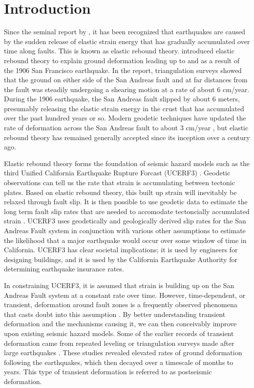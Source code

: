 \chapter{Introduction}


Since the seminal report by \citet{Reid1910}, it has been recognized
that earthquakes are caused by the sudden release of elastic strain
energy that has gradually accumulated over time along faults. This is
known as elastic rebound theory. \citet{Reid1910} introduced elastic
rebound theory to explain ground deformation leading up to and as a
result of the 1906 San Francisco earthquake. In the report,
triangulation surveys showed that the ground on either side of the San
Andreas fault and at far distances from the fault was steadily
undergoing a shearing motion at a rate of about 6 cm/year. During the
1906 earthquake, the San Andreas fault slipped by about 6 meters,
presumably releasing the elastic strain energy in the crust that has
accumulated over the past hundred years or so. Modern geodetic
techniques have updated the rate of deformation across the San Andreas
fault to about 3 cm/year \citep{Savage1973}, but elastic rebound
theory has remained generally accepted since its inception over a
century ago.

Elastic rebound theory forms the foundation of seismic hazard models
such as the third Unified California Earthquake Rupture Forcast
(UCERF3) \citep{Field2014}. Geodetic observations can tell us the rate
that strain is accumulating between tectonic plates. Based on elastic
rebound theory, this built up strain will inevitably be relaxed through
fault slip. It is then possible to use geodetic data to estimate the
long term fault slip rates that are needed to accomodate tectoncially
accumulated strain \citep[e.g.,][]{Savage1973,Meade2005}. UCERF3 uses
geodetically and geologically derived slip rates for the San Andreas
Fault system in conjunction with various other assumptions to estimate
the likelihood that a major earthquake would occur over some window of
time in California. UCERF3 has clear societal implications; it is used
by engineers for designing buildings, and it is used by the California
Earthquake Authority for determining earthquake insurance rates.

In constraining UCERF3, it is assumed that strain is building up on
the San Andreas Fault system at a constant rate over time. However,
time-dependent, or transient, deformation around fault zones is a
frequently observed phenomena that casts doubt into this assumption
\citep{Thatcher1983}. By better understanding transient deformation
and the mechanisms causing it, we can then conceivably improve upon
existing seismic hazard models. Some of the earlier records of
transient deformation came from repeated leveling or triangulation
surveys made after large earthquakes \citep[e.g.,][]{Tsuboi1932,
Smith1968}. These studies revealed elevated rates of ground
deformation following the earthquakes, which then decayed over a
timescale of months to years. This type of transient deformation is
referred to as postseismic deformation.

